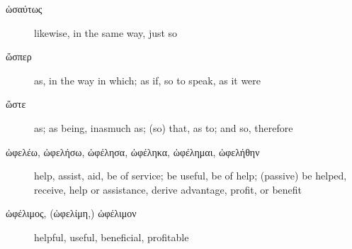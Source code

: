 \documentclass[12pt,letterpaper]{article}
\begin{document}
\begin{description}
    \item[\textgreek{ὡσαύτως}] likewise, in the same way, just so
    \item[\textgreek{ὥσπερ}] \marginnote{*}as, in the way in which; as if, so to speak, as it were
    \item[\textgreek{ὥστε}] \marginnote{*}as; as being, inasmuch as; (so) that, as to; and so, therefore
    \item[\textgreek{ὠφελέω, ὠφελήσω, ὠφέλησα, ὠφέληκα, ὠφέλημαι, ὠφελήθην}] help, assist, aid, be of service; be useful, be of help; (passive) be helped, receive, help or assistance, derive advantage, profit, or benefit
    \item[\textgreek{ὠφέλιμος, (ὠφελίμη,) ὠφέλιμον}] helpful, useful, beneficial, profitable
\end{description}


\clearpage

\printbibliography
\end{document}

